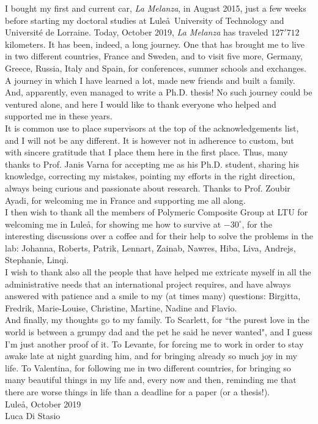 I bought my first and current car, \emph{La Melanza}, in August 2015, just a few weeks before starting my doctoral studies at Lule\aa\ University of Technology and Universit\'e de Lorraine. Today, October 2019, \emph{La Melanza} has traveled $127'712$ kilometers. It has been, indeed, a long journey. One that has brought me to live in two different countries, France and Sweden, and to visit five more, Germany, Greece, Russia, Italy and Spain, for conferences, summer schools and exchanges. A journey in which I have learned a lot, made new friends and built a family. And, apparently, even managed to write a Ph.D. thesis! No such journey could be ventured alone, and here I would like to thank everyone who helped and supported me in these years.\\
It is common use to place supervisors at the top of the acknowledgements list, and I will not be any different. It is however not in adherence to custom, but with sincere gratitude that I place them here in the first place. Thus, many thanks to Prof. Janis Varna for accepting me as his Ph.D. student, sharing his knowledge, correcting my mistakes, pointing my efforts in the right direction, always being curious and passionate about research. Thanks to Prof. Zoubir Ayadi, for welcoming me in France and supporting me all along.\\
I then wish to thank all the members of Polymeric Composite Group at LTU for welcoming me in Lule\aa, for showing me how to survive at $-30^{\circ}$, for the interesting discussions over a coffee and for their help to solve the problems in the lab: Johanna, Roberts, Patrik, Lennart, Zainab, Nawres, Hiba, Liva, Andrejs, Stephanie, Linqi.\\
I wish to thank also all the people that have helped me extricate myself in all the administrative needs that an international project requires, and have always answered with patience and a smile to my (at times many) questions: Birgitta, Fredrik, Marie-Louise, Christine, Martine, Nadine and Flavio.\\
And finally, my thoughts go to my family. To Scarlett, for ``the purest love in the world is between a grumpy dad and the pet he said he never wanted", and I guess I'm just another proof of it. To Levante, for forcing me to work in order to stay awake late at night guarding him, and for bringing already so much joy in my life. To Valentina, for following me in two different countries, for bringing so many beautiful things in my life and, every now and then, reminding me that there are worse things in life than a deadline for a paper (or a thesis!).\\

\noindent Lule\aa, October 2019\\
Luca Di Stasio
